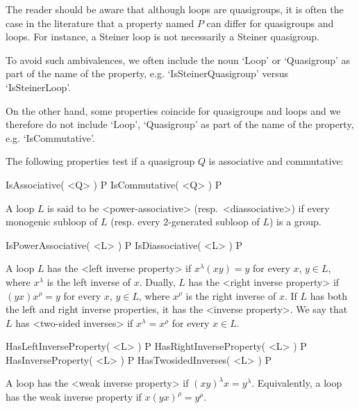
The reader should be aware that although loops are quasigroups, it is often the
case in the literature that a property named $P$ can differ for quasigroups and
loops. For instance, a Steiner loop is not necessarily a Steiner quasigroup.

To avoid such ambivalences, we often include the noun `Loop' or `Quasigroup' as
part of the name of the property, e.g. `IsSteinerQuasigroup' versus
`IsSteinerLoop'.

On the other hand, some properties coincide for quasigroups and loops and we
therefore do not include `Loop', `Quasigroup' as part of the name of the
property, e.g. `IsCommutative'.


The following properties test if a quasigroup $Q$ is associative and
commutative:

\>IsAssociative( <Q> ) P
\>IsCommutative( <Q> ) P

A loop $L$ is said to be <power-associative>
(resp.\ <diassociative>) if every monogenic subloop
of $L$ (resp. every $2$-generated subloop of $L$) is a group.

\>IsPowerAssociative( <L> ) P
\>IsDiassociative( <L> ) P


A loop $L$ has the <left inverse property> if
$x^\lambda(xy)=y$ for every $x$, $y\in L$, where $x^\lambda$ is the left
inverse of $x$. Dually, $L$ has the <right inverse property> if $(yx)x^\rho=y$ for every $x$, $y\in L$, where $x^\rho$ is
the right inverse of $x$. If $L$ has both the left and right inverse
properties, it has the <inverse property>. We say that
$L$ has <two-sided inverses> if
$x^\lambda=x^\rho$ for every $x\in L$.

\>HasLeftInverseProperty( <L> ) P
\>HasRightInverseProperty( <L> ) P
\>HasInverseProperty( <L> ) P
\>HasTwosidedInverses( <L> ) P

A loop has the <weak inverse property> if
$(xy)^\lambda x = y^\lambda$. Equivalently, a loop has the weak inverse
property if $x(yx)^\rho = y^\rho$.

